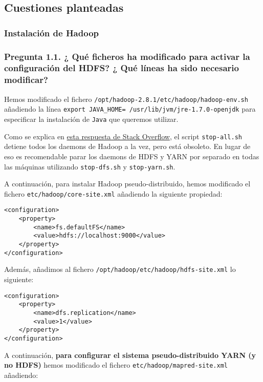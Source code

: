 \documentclass[11pt]{article}
\def\inline{\lstinline[basicstyle=\ttfamily,keywordstyle={}]}
\begin{document}
\subsection{ Cuestiones planteadas}

\subsubsection{ Instalación de Hadoop }

\subsubsection*{ Pregunta 1.1. ¿ Qué ficheros ha modificado para activar la configuración del HDFS? ¿ Qué líneas ha sido necesario modificar? }

Hemos modificado el fichero \inline{/opt/hadoop-2.8.1/etc/hadoop/hadoop-env.sh} añadiendo la línea \inline{export JAVA_HOME= /usr/lib/jvm/jre-1.7.0-openjdk} para especificar la instalación de \inline{Java} que queremos utilizar.

Como se explica en \href{https://stackoverflow.com/questions/17569423/what-is-best-way-to-start-and-stop-hadoop-ecosystem-with-command-line}{esta respuesta de Stack Overflow}, el script \inline{stop-all.sh} detiene todos los daemons de Hadoop a la vez, pero está obsoleto. En lugar de eso es recomendable parar los daemons de HDFS y YARN por separado en todas las máquinas utilizando \inline|stop-dfs.sh| y \inline{stop-yarn.sh}.

A continuación, para instalar Hadoop pseudo-distribuido, hemos modificado el fichero \inline{etc/hadoop/core-site.xml} añadiendo la siguiente propiedad:

\begin{verbatim}
<configuration>
    <property>
        <name>fs.defaultFS</name>
        <value>hdfs://localhost:9000</value>
    </property>
</configuration>
\end{verbatim}

Además, añadimos al fichero \inline{/opt/hadoop/etc/hadoop/hdfs-site.xml} lo siguiente:

\begin{verbatim}
<configuration>
    <property>
        <name>dfs.replication</name>
        <value>1</value>
    </property>
</configuration>
\end{verbatim}

A continuación, \textbf{para configurar el sistema pseudo-distribuido YARN (y no HDFS)} hemos modificado el fichero \inline{etc/hadoop/mapred-site.xml} añadiendo:
\end{document}
